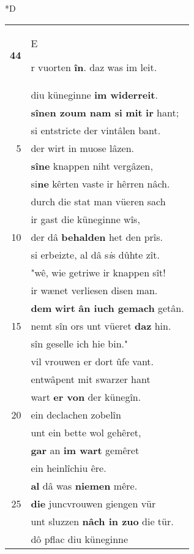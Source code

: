 \documentclass[8pt,a4paper,notitlepage]{article}
\begin{document}
\begin{table}[ht]
\begin{minipage}[t]{0.5\linewidth}
\small
\begin{center}*D
\end{center}
\begin{tabular}{rl}
\textbf{44} & \begin{large}E\end{large}r vuorten \textbf{în}. daz was im leit.\\ 
 & diu küneginne \textbf{im widerreit}.\\ 
 & \textbf{sînen zoum nam si} \textbf{mit} \textbf{ir} hant;\\ 
 & si entstricte der vintâlen bant.\\ 
5 & der wirt in muose lâzen.\\ 
 & \textbf{sîne} knappen niht vergâzen,\\ 
 & si\textbf{ne} kêrten vaste ir hêrren nâch.\\ 
 & durch die stat man vüeren sach\\ 
 & ir gast die küneginne wîs,\\ 
10 & der dâ \textbf{behalden} het den prîs.\\ 
 & si erbeizte, al dâ s\textit{i}s dûhte zît.\\ 
 & "wê, wie getriwe ir knappen sît!\\ 
 & ir wænet verliesen disen man.\\ 
 & \textbf{dem} \textbf{wirt} \textbf{ân iuch gemach} getân.\\ 
15 & nemt sîn ors unt vüeret \textbf{daz} hin.\\ 
 & sîn geselle ich hie bin."\\ 
 & vil vrouwen er dort ûfe vant.\\ 
 & entwâpent mit swarzer hant\\ 
 & wart \textbf{er von} der künegîn.\\ 
20 & ein declachen zobelîn\\ 
 & unt ein bette wol gehêret,\\ 
 & \textbf{gar} an \textbf{im wart} gemêret\\ 
 & ein heinlîchiu êre.\\ 
 & \textbf{al} dâ was \textbf{niemen} mêre.\\ 
25 & \textbf{die} juncvrouwen giengen vür\\ 
 & unt sluzzen \textbf{nâch in zuo} die tür.\\ 
 & dô pflac diu küneginne\\ 

\end{tabular}
\end{minipage}
\end{table}
\end{document}
